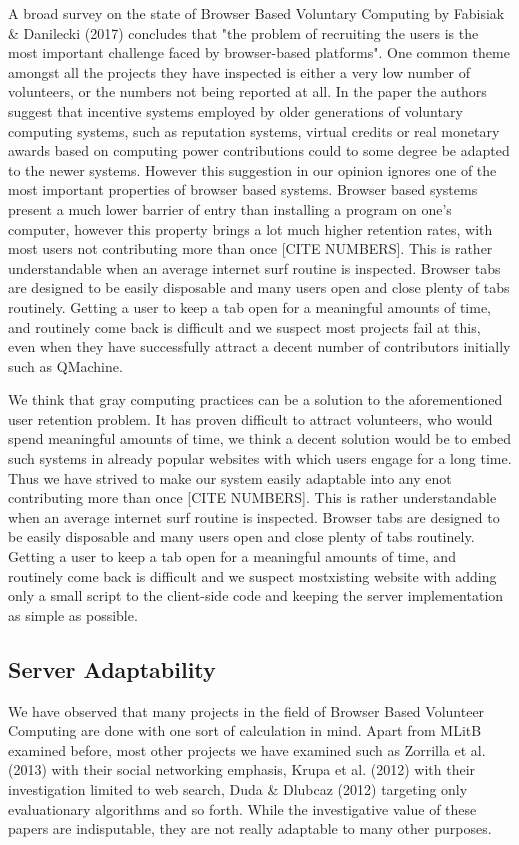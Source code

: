 A broad survey on the state of Browser Based Voluntary Computing by Fabisiak \& Danilecki (2017) concludes that "the problem of recruiting the users is the most important challenge faced by browser-based platforms". One common theme amongst all the projects they have inspected is either a very low number of volunteers, or the numbers not being reported at all. In the paper the authors suggest that incentive systems employed by older generations of voluntary computing systems, such as reputation systems, virtual credits or real monetary awards based on computing power contributions could to some degree be adapted to the newer systems. However this suggestion in our opinion ignores one of the most important properties of browser based systems. Browser based systems present a much lower barrier of entry than installing a program on one's computer, however this property brings a lot much higher retention rates, with most users not contributing more than once [CITE NUMBERS]. This is rather understandable when an average internet surf routine is inspected. Browser tabs are designed to be easily disposable and many users open and close plenty of tabs routinely. Getting a user to keep a tab open for a meaningful amounts of time, and routinely come back is difficult and we suspect most projects fail at this, even when they have successfully attract a decent number of contributors initially such as QMachine. 

We think that gray computing practices can be a solution to the aforementioned user retention problem. It has proven difficult to attract volunteers, who would spend meaningful amounts of time, we think a decent solution would be to embed such systems in already popular websites with which users engage for a long time. Thus we have strived to make our system easily adaptable into any enot contributing more than once [CITE NUMBERS]. This is rather understandable when an average internet surf routine is inspected. Browser tabs are designed to be easily disposable and many users open and close plenty of tabs routinely. Getting a user to keep a tab open for a meaningful amounts of time, and routinely come back is difficult and we suspect mostxisting website with adding only a small script to the client-side code and keeping the server implementation as simple as possible. 

\subsection{Server Adaptability}
We have observed that many projects in the field of Browser Based Volunteer Computing are done with one sort of calculation in mind. Apart from MLitB examined before, most other projects we have examined such as Zorrilla et al. (2013) \cite{zorrilla2013web} with their social networking emphasis, Krupa et al. (2012) \cite{krupa2012demand} with their investigation limited to web search, Duda \& Dlubcaz (2012) \cite{duda2012distributed} targeting only evaluationary algorithms and so forth. While the investigative value of these papers are indisputable, they are not really adaptable to many other purposes. 

